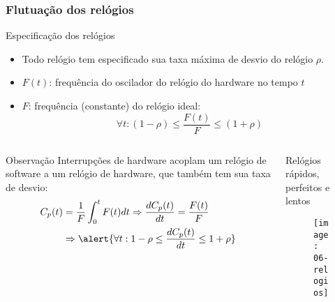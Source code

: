 \documentclass[Ligatures=TeX,table,brazil,svgnames,usetotalslideindicator,compress,10pt]{beamer}
\begin{document}
\begin{frame}
  \frametitle{Flutuação dos relógios}
  \small
  \begin{block}{Especificação dos relógios}
    \begin{itemize}
    \item Todo relógio tem especificado sua \alert{taxa máxima de desvio do relógio} $\rho$.
    \item $F(t)$: frequência do oscilador do relógio do hardware no tempo $t$
    \item $F$: frequência (constante) do relógio ideal:
      \[ \forall t : (1-\rho) \le \frac{F(t)}{F} \le (1+\rho)  \]
    \end{itemize}
  \end{block}

  \begin{columns}[t]
    \begin{column}{.5\textwidth}
      \begin{block}{Observação}
        Interrupções de hardware acoplam um relógio de software a um relógio de hardware, que também tem sua taxa de desvio:
        \begin{align*}
          C_p(t) &= \frac{1}{F} \int^{t}_{0} F(t)dt \Rightarrow \frac{dC_p(t)}{dt} = \frac{F(t)}{F} \\
          &\Rightarrow \alert{\forall t: 1-\rho \le \frac{dC_p(t)}{dt} \le 1 + \rho}
        \end{align*}
      \end{block}
    \end{column}
    \begin{column}{.5\textwidth}
      \begin{block}{Relógios rápidos, perfeitos e lentos}
  \begin{figure}
    \centering
    \texttt{[image: 06-relogios]}
  \end{figure}
        \end{block}
    \end{column}
  \end{columns}

\end{frame}
\end{document}
